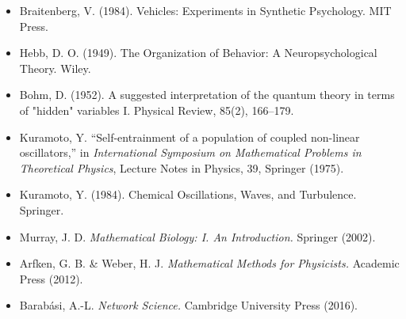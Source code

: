 \begin{itemize}
\item Braitenberg, V. (1984). Vehicles: Experiments in Synthetic Psychology. MIT Press.
\item Hebb, D. O. (1949). The Organization of Behavior: A Neuropsychological Theory. Wiley.
\item Bohm, D. (1952). A suggested interpretation of the quantum theory in terms of "hidden" variables I. Physical Review, 85(2), 166--179.
\item Kuramoto, Y. ``Self-entrainment of a population of coupled non-linear oscillators,'' in \emph{International Symposium on Mathematical Problems in Theoretical Physics}, Lecture Notes in Physics, 39, Springer (1975).
\item Kuramoto, Y. (1984). Chemical Oscillations, Waves, and Turbulence. Springer.
\item Murray, J. D. \emph{Mathematical Biology: I. An Introduction.} Springer (2002).
\item Arfken, G. B. \& Weber, H. J. \emph{Mathematical Methods for Physicists.} Academic Press (2012).
\item Barab\'asi, A.-L. \emph{Network Science.} Cambridge University Press (2016).


\end{itemize}
